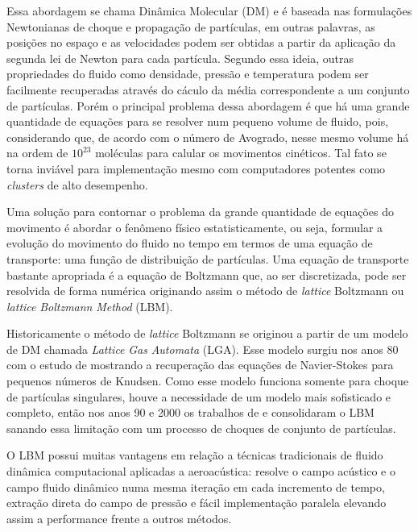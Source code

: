 Essa abordagem se chama Dinâmica Molecular (DM) e é baseada nas formulações Newtonianas de choque e propagação de partículas, em outras palavras, as posições no espaço e as velocidades podem ser obtidas a partir da aplicação da segunda lei de Newton para cada partícula. Segundo essa ideia, outras propriedades do fluido como densidade, pressão e temperatura podem ser facilmente recuperadas através do cáculo da média correspondente a um conjunto de partículas. Porém o principal problema dessa abordagem é que há uma grande quantidade de equações para se resolver num pequeno volume de fluido, pois, considerando que, de acordo com o número de Avogrado, nesse mesmo volume há na ordem de $10^{23}$ moléculas para calular os movimentos cinéticos. Tal fato se torna inviável para implementação mesmo com computadores potentes como \textit{clusters} de alto desempenho.

Uma solução para contornar o problema da grande quantidade de equações do movimento é abordar o fenômeno físico estatisticamente, ou seja, formular a evolução do movimento do fluido no tempo em termos de uma equação de transporte: uma função de distribuição de partículas. Uma equação de transporte bastante apropriada é a equação de Boltzmann que, ao ser discretizada, pode ser resolvida de forma numérica originando assim o método de \textit{lattice} Boltzmann ou \textit{lattice} \textit{Boltzmann} \textit{Method} (LBM).

Historicamente o método de \textit{lattice} Boltzmann se originou a partir de um modelo de DM chamada \textit{Lattice} \textit{Gas} \textit{Automata} (LGA). Esse modelo surgiu nos anos 80 com o estudo de  mostrando a recuperação das equações de Navier-Stokes para pequenos números de Knudsen. Como esse modelo funciona somente para choque de partículas singulares, houve a necessidade de um modelo mais sofisticado e completo, então nos anos 90 e 2000 os trabalhos de  e  consolidaram o LBM sanando essa limitação com um processo de choques de conjunto de partículas.

O LBM possui muitas vantagens em relação a técnicas tradicionais de fluido dinâmica computacional aplicadas a aeroacústica: resolve o campo acústico e o campo fluido dinâmico numa mesma iteração em cada incremento de tempo, extração direta do campo de pressão e fácil implementação paralela elevando assim a performance frente a outros métodos.

